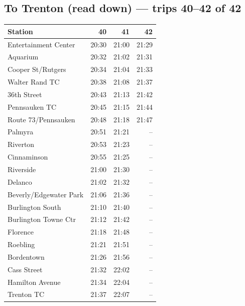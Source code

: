 \subsection*{To Trenton (read down) --- trips 40--42 of 42}
\begin{center}\footnotesize\setlength{\tabcolsep}{3pt}\begin{tabular}{@{}lrrr@{}}\toprule
Station & 40 & 41 & 42 \\\midrule
Entertainment Center & 20:30 & 21:00 & 21:29 \\
Aquarium & 20:32 & 21:02 & 21:31 \\
Cooper St/Rutgers & 20:34 & 21:04 & 21:33 \\
Walter Rand TC & 20:38 & 21:08 & 21:37 \\
36th Street & 20:43 & 21:13 & 21:42 \\
Pennsauken TC & 20:45 & 21:15 & 21:44 \\
Route 73/Pennsauken & 20:48 & 21:18 & 21:47 \\
Palmyra & 20:51 & 21:21 & -- \\
Riverton & 20:53 & 21:23 & -- \\
Cinnaminson & 20:55 & 21:25 & -- \\
Riverside & 21:00 & 21:30 & -- \\
Delanco & 21:02 & 21:32 & -- \\
Beverly/Edgewater Park & 21:06 & 21:36 & -- \\
Burlington South & 21:10 & 21:40 & -- \\
Burlington Towne Ctr & 21:12 & 21:42 & -- \\
Florence & 21:18 & 21:48 & -- \\
Roebling & 21:21 & 21:51 & -- \\
Bordentown & 21:26 & 21:56 & -- \\
Cass Street & 21:32 & 22:02 & -- \\
Hamilton Avenue & 21:34 & 22:04 & -- \\
Trenton TC & 21:37 & 22:07 & -- \\
\bottomrule\end{tabular}\end{center}
